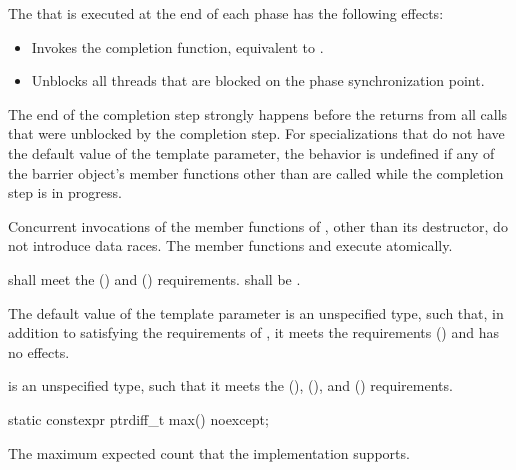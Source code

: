 \pnum
The 
that is executed at the end of each phase has the following effects:
\begin{itemize}
\item Invokes the completion function, equivalent to .
\item Unblocks all threads that are blocked on the phase synchronization point.
\end{itemize}
The end of the completion step strongly happens before
the returns from all calls that were unblocked by the completion step.
For specializations that do not have
the default value of the  template parameter,
the behavior is undefined if any of the barrier object's member functions
other than  are called while the completion step is in progress.

\pnum
Concurrent invocations of the member functions of ,
other than its destructor, do not introduce data races.
The member functions  and 
execute atomically.

\pnum
{} shall meet the
 () and
 () requirements.
 shall be .

\pnum
The default value of the  template parameter is
an unspecified type, such that,
in addition to satisfying the requirements of ,
it meets the 
requirements () and
 has no effects.

\pnum
{} is an unspecified type,
such that it meets the
 (),
 (), and
 () requirements.

%
\begin{itemdecl}
static constexpr ptrdiff_t max() noexcept;
\end{itemdecl}

\begin{itemdescr}
\pnum
\returns
The maximum expected count that the implementation supports.
\end{itemdescr}

